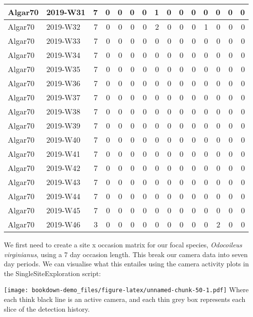 \documentclass[]{book}
\begin{document}
\begin{table}
\begin{tabular}[t]{l|l|r|r|r|r|r|r|r|r|r|r|r|r|r}
\hline
Algar70 & 2019-W31 & 7 & 0 & 0 & 0 & 0 & 1 & 0 & 0 & 0 & 0 & 0 & 0 & 0\\
\hline
Algar70 & 2019-W32 & 7 & 0 & 0 & 0 & 0 & 2 & 0 & 0 & 0 & 1 & 0 & 0 & 0\\
\hline
Algar70 & 2019-W33 & 7 & 0 & 0 & 0 & 0 & 0 & 0 & 0 & 0 & 0 & 0 & 0 & 0\\
\hline
Algar70 & 2019-W34 & 7 & 0 & 0 & 0 & 0 & 0 & 0 & 0 & 0 & 0 & 0 & 0 & 0\\
\hline
Algar70 & 2019-W35 & 7 & 0 & 0 & 0 & 0 & 0 & 0 & 0 & 0 & 0 & 0 & 0 & 0\\
\hline
Algar70 & 2019-W36 & 7 & 0 & 0 & 0 & 0 & 0 & 0 & 0 & 0 & 0 & 0 & 0 & 0\\
\hline
Algar70 & 2019-W37 & 7 & 0 & 0 & 0 & 0 & 0 & 0 & 0 & 0 & 0 & 0 & 0 & 0\\
\hline
Algar70 & 2019-W38 & 7 & 0 & 0 & 0 & 0 & 0 & 0 & 0 & 0 & 0 & 0 & 0 & 0\\
\hline
Algar70 & 2019-W39 & 7 & 0 & 0 & 0 & 0 & 0 & 0 & 0 & 0 & 0 & 0 & 0 & 0\\
\hline
Algar70 & 2019-W40 & 7 & 0 & 0 & 0 & 0 & 0 & 0 & 0 & 0 & 0 & 0 & 0 & 0\\
\hline
Algar70 & 2019-W41 & 7 & 0 & 0 & 0 & 0 & 0 & 0 & 0 & 0 & 0 & 0 & 0 & 0\\
\hline
Algar70 & 2019-W42 & 7 & 0 & 0 & 0 & 0 & 0 & 0 & 0 & 0 & 0 & 0 & 0 & 0\\
\hline
Algar70 & 2019-W43 & 7 & 0 & 0 & 0 & 0 & 0 & 0 & 0 & 0 & 0 & 0 & 0 & 0\\
\hline
Algar70 & 2019-W44 & 7 & 0 & 0 & 0 & 0 & 0 & 0 & 0 & 0 & 0 & 0 & 0 & 0\\
\hline
Algar70 & 2019-W45 & 7 & 0 & 0 & 0 & 0 & 0 & 0 & 0 & 0 & 0 & 0 & 0 & 0\\
\hline
Algar70 & 2019-W46 & 3 & 0 & 0 & 0 & 0 & 0 & 0 & 0 & 0 & 0 & 2 & 0 & 0\\
\hline
\end{tabular}
\end{table}

We first need to create a site x occasion matrix for our focal species,
\emph{Odocoileus virginianus}, using a 7 day occasion length. This break
our camera data into seven day periods. We can visualise what this
entailes using the camera activity plots in the SingleSiteExploration
script:

\texttt{[image: bookdown-demo\_files/figure-latex/unnamed-chunk-50-1.pdf]}
Where each think black line is an active camera, and each thin grey box
represents each slice of the detection history.
\end{document}
